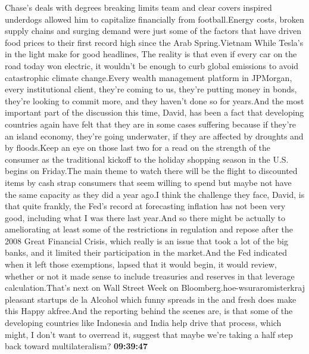 \documentclass{article}%
\begin{document}
Chase's deals with degrees breaking limits team and clear covers inspired underdogs allowed him to capitalize financially from football.Energy costs, broken supply chains and surging demand were just some of the factors that have driven food prices to their first record high since the Arab Spring.Vietnam While Tesla's in the light make for good headlines, The reality is that even if every car on the road today won electric, it wouldn't be enough to curb global emissions to avoid catastrophic climate change.Every wealth management platform in JPMorgan, every institutional client, they're coming to us, they're putting money in bonds, they're looking to commit more, and they haven't done so for years.And the most important part of the discussion this time, David, has been a fact that developing countries again have felt that they are in some cases suffering because if they're an island economy, they're going underwater, if they are affected by droughts and by floods.Keep an eye on those last two for a read on the strength of the consumer as the traditional kickoff to the holiday shopping season in the U.S. begins on Friday.The main theme to watch there will be the flight to discounted items by cash strap consumers that seem willing to spend but maybe not have the same capacity as they did a year ago.I think the challenge they face, David, is that quite frankly, the Fed's record at forecasting inflation has not been very good, including what I was there last year.And so there might be actually to ameliorating at least some of the restrictions in regulation and repose after the 2008 Great Financial Crisis, which really is an issue that took a lot of the big banks, and it limited their participation in the market.And the Fed indicated when it left those exemptions, lapsed that it would begin, it would review, whether or not it made sense to include treasuries and reserves in that leverage calculation.That's next on Wall Street Week on Bloomberg.hoe{-}wsuraromisterkraj  pleasant startups de la Alcohol which funny spreads in the and fresh does make this Happy akfree.And the reporting behind the scenes are, is that some of the developing countries like Indonesia and India help drive that process, which might, I don't want to overread it, suggest that maybe we're taking a half step back toward multilateralism?%
\textbf{09:39:47}%
\newline%
\end{document}
